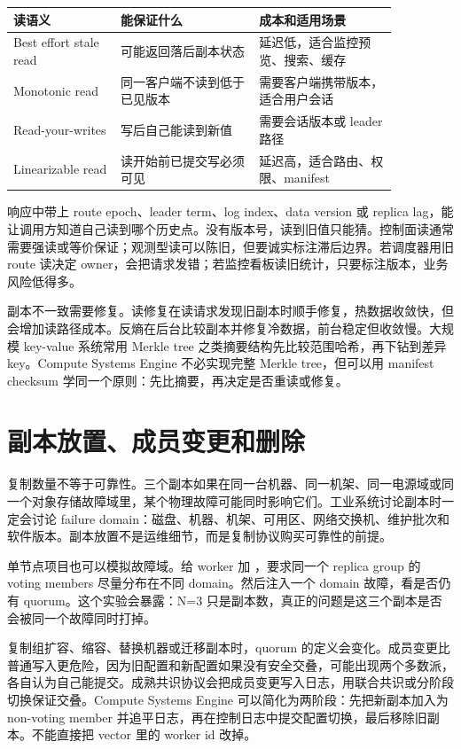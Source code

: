 \begin{center}
\begin{tabular}{p{0.24\linewidth}p{0.31\linewidth}p{0.31\linewidth}}
\toprule
读语义 & 能保证什么 & 成本和适用场景 \\
\midrule
Best effort stale read & 可能返回落后副本状态 & 延迟低，适合监控预览、搜索、缓存 \\
Monotonic read & 同一客户端不读到低于已见版本 & 需要客户端携带版本，适合用户会话 \\
Read-your-writes & 写后自己能读到新值 & 需要会话版本或 leader 路径 \\
Linearizable read & 读开始前已提交写必须可见 & 延迟高，适合路由、权限、manifest \\
\bottomrule
\end{tabular}
\end{center}

响应中带上 route epoch、leader term、log index、data version 或 replica lag，能让调用方知道自己读到哪个历史点。没有版本号，读到旧值只能猜。控制面读通常需要强读或等价保证；观测型读可以陈旧，但要诚实标注滞后边界。若调度器用旧 route 读决定 owner，会把请求发错；若监控看板读旧统计，只要标注版本，业务风险低得多。

副本不一致需要修复。读修复在读请求发现旧副本时顺手修复，热数据收敛快，但会增加读路径成本。反熵在后台比较副本并修复冷数据，前台稳定但收敛慢。大规模 key-value 系统常用 Merkle tree 之类摘要结构先比较范围哈希，再下钻到差异 key。Compute Systems Engine 不必实现完整 Merkle tree，但可以用 manifest checksum 学同一个原则：先比摘要，再决定是否重读或修复。

\section{副本放置、成员变更和删除}

复制数量不等于可靠性。三个副本如果在同一台机器、同一机架、同一电源域或同一个对象存储故障域里，某个物理故障可能同时影响它们。工业系统讨论副本时一定会讨论 failure domain：磁盘、机器、机架、可用区、网络交换机、维护批次和软件版本。副本放置不是运维细节，而是复制协议购买可靠性的前提。

单节点项目也可以模拟故障域。给 worker 加 ，要求同一个 replica group 的 voting members 尽量分布在不同 domain。然后注入一个 domain 故障，看是否仍有 quorum。这个实验会暴露：N=3 只是副本数，真正的问题是这三个副本是否会被同一个故障同时打掉。

复制组扩容、缩容、替换机器或迁移副本时，quorum 的定义会变化。成员变更比普通写入更危险，因为旧配置和新配置如果没有安全交叠，可能出现两个多数派，各自认为自己能提交。成熟共识协议会把成员变更写入日志，用联合共识或分阶段切换保证交叠。Compute Systems Engine 可以简化为两阶段：先把新副本加入为 non-voting member 并追平日志，再在控制日志中提交配置切换，最后移除旧副本。不能直接把 vector 里的 worker id 改掉。

